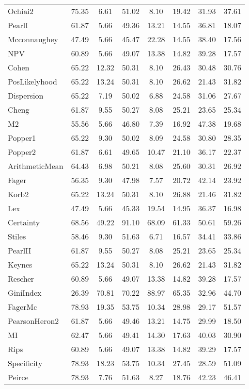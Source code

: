 \begin{tabular}{l||c|c|c|c|c|c|c}
Ochiai2& 75.35& 6.61& 51.02& 8.10& 19.42& 31.93& 37.61\\
PearlI& 61.87& 5.66& 49.36& 13.21& 14.55& 36.81& 18.07\\
Mcconnaughey& 47.49& 5.66& 45.47& 22.28& 14.55& 38.40& 17.56\\
NPV& 60.89& 5.66& 49.07& 13.38& 14.82& 39.28& 17.57\\
Cohen& 65.22& 12.32& 50.31& 8.10& 26.43& 30.48& 30.76\\
PosLikelyhood& 65.22& 13.24& 50.31& 8.10& 26.62& 21.43& 31.82\\
Dispersion& 65.22& 7.19& 50.02& 6.88& 24.58& 31.06& 27.67\\
Cheng& 61.87& 9.55& 50.27& 8.08& 25.21& 23.65& 25.34\\
M2& 55.56& 5.66& 46.80& 7.39& 16.92& 47.38& 19.68\\
Popper1& 65.22& 9.30& 50.02& 8.09& 24.58& 30.80& 28.35\\
Popper2& 61.87& 6.61& 49.65& 10.47& 21.10& 36.17& 22.37\\
ArithmeticMean& 64.43& 6.98& 50.21& 8.08& 25.60& 30.31& 26.92\\
Fager& 56.35& 9.30& 47.98& 7.57& 20.72& 42.14& 23.92\\
Korb2& 65.22& 13.24& 50.31& 8.10& 26.88& 21.46& 31.82\\
Lex& 47.49& 5.66& 45.33& 19.54& 14.95& 36.37& 16.98\\
Certainty& 68.56& 49.22& 91.10& 68.09& 61.33& 50.61& 59.26\\
Stiles& 58.46& 9.30& 51.63& 6.71& 16.57& 34.41& 33.86\\
PearlII& 61.87& 9.55& 50.27& 8.08& 25.21& 23.65& 25.34\\
Keynes& 65.22& 13.24& 50.31& 8.10& 26.62& 21.43& 31.82\\
Rescher& 60.89& 5.66& 49.07& 13.38& 14.82& 39.28& 17.57\\
GiniIndex& 26.39& 70.81& 70.22& 88.97& 65.35& 32.96& 44.70\\
FagerMc& 78.93& 19.35& 53.75& 10.34& 28.98& 29.17& 51.57\\
PearsonHeron2& 61.87& 5.66& 49.46& 13.21& 14.75& 29.99& 18.50\\
MI& 62.47& 5.66& 49.41& 14.30& 17.63& 40.03& 30.90\\
Rips& 60.89& 5.66& 49.07& 13.38& 14.82& 39.29& 17.57\\
Specificity& 78.93& 18.23& 53.75& 10.34& 27.45& 28.59& 51.09\\
Peirce& 78.93& 7.76& 51.63& 8.27& 18.76& 42.23& 46.41\\

\end{tabular}
